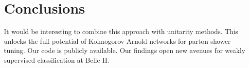 \section{Conclusions}\label{sec:conclusions}

It would be interesting to combine this approach with unitarity methods.
This unlocks the full potential of Kolmogorov-Arnold networks for parton
shower tuning. Our code is publicly available. Our findings open new
avenues for weakly supervised classification at Belle II.

